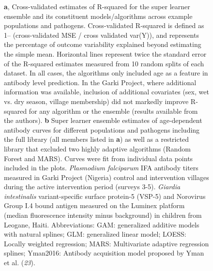 \documentclass[11pt]{article}
\begin{document}
\begin{landscape}
\begin{figure}[htbp]
\begin{center}
\begin{minipage}{1.3\textwidth}
\caption{\textbf{a}, Cross-validated estimates of R-squared for the super learner ensemble and its constituent models/algorithms across example populations and pathogens. Cross-validated R-squared is defined as 1-- (cross-validated MSE / cross validated var(Y)), and represents the percentage of outcome variability explained beyond estimating the simple mean. Horizontal lines represent twice the standard error of the R-squared estimates measured from 10 random splits of each dataset. In all cases, the algorithms only included age as a feature in antibody level prediction. In the Garki Project, where additional information was available, inclusion of additional covariates (sex, wet vs. dry season, village membership) did not markedly improve R-squared for any algorithm or the ensemble (results available from the authors).
\textbf{b} Super learner ensemble  estimates of age-dependent antibody curves for different populations and pathogens including the full library (all members listed in \textbf{a}) as well as a restricted library that excluded two highly adaptive algorithms (Random Forest and MARS). Curves were fit from individual data points included in the plots. 
\textit{Plasmodium falciparum} IFA antibody titers measured in Garki Project (Nigeria) control and intervention villages during the active intervention period (surveys 3-5). \textit{Giardia intestinalis} variant-specific surface protein-5 (VSP-5) and Norovirus Group I.4 bound antigen measured on the Luminex platform (median fluorescence intensity minus background) in children from Leogane, Haiti.
Abbreviations: GAM: generalized additive models with natural splines; GLM: generalized linear model; LOESS: Locally weighted regression; MARS: Multivariate adaptive regression splines; Yman2016: Antibody acquisition model proposed by Yman et al. (\textit{23}).}
\label{fig:CVSL}
\end{minipage}
\end{center}
\end{figure}
\end{landscape}




%
\end{document}
